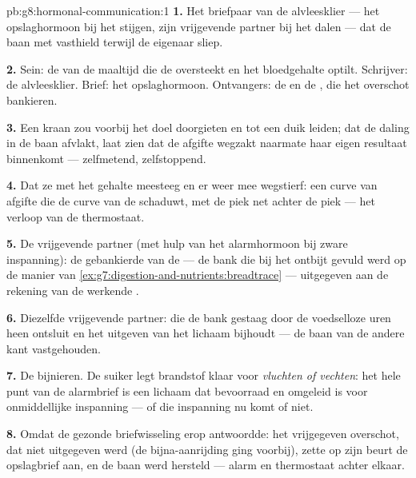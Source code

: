 \begin{solution}{pb:g8:hormonal-communication:1}
\textbf{1.} Het briefpaar van de alvleesklier --- het opslaghormoon bij het
stijgen, zijn vrijgevende partner bij het dalen --- dat de baan met
 vasthield terwijl de eigenaar sliep.

\textbf{2.} Sein: de  van de maaltijd die de  oversteekt
en het bloedgehalte optilt. Schrijver: de alvleesklier. Brief: het
opslaghormoon. Ontvangers: de  en de , die het overschot
bankieren.

\textbf{3.} Een kraan zou voorbij het doel doorgieten en tot een duik
leiden; dat de daling in de baan afvlakt, laat zien dat de afgifte wegzakt
naarmate haar eigen resultaat binnenkomt --- zelfmetend, zelfstoppend.

\textbf{4.} Dat ze met het gehalte meesteeg en er weer mee wegstierf: een
curve van afgifte die de curve van de  schaduwt, met de piek net
achter de piek --- het verloop van de thermostaat.

\textbf{5.} De vrijgevende partner (met hulp van het alarmhormoon bij
zware inspanning): de gebankierde  van de  --- de bank die bij
het ontbijt gevuld werd op de manier van
\cref{ex:g7:digestion-and-nutrients:breadtrace} --- uitgegeven aan de
rekening van de werkende .

\textbf{6.} Diezelfde vrijgevende partner: die de bank gestaag door de
voedselloze uren heen ontsluit en het uitgeven van het lichaam bijhoudt ---
de baan van de andere kant vastgehouden.

\textbf{7.} De bijnieren. De suiker legt brandstof klaar voor
\emph{vluchten of vechten}: het hele punt van de alarmbrief is een lichaam
dat bevoorraad en omgeleid is voor onmiddellijke inspanning --- of die
inspanning nu komt of niet.

\textbf{8.} Omdat de gezonde briefwisseling erop antwoordde: het
vrijgegeven overschot, dat niet uitgegeven werd (de bijna-aanrijding ging
voorbij), zette op zijn beurt de opslagbrief aan, en de baan werd hersteld
--- alarm en thermostaat achter elkaar.


\end{solution}
